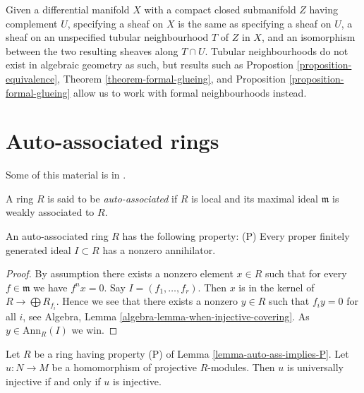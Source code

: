 \begin{remark}
\label{remark-topological-analogue}
Given a differential manifold $X$ with a compact closed submanifold $Z$
having complement $U$, specifying a sheaf on $X$ is the same as specifying 
a sheaf on $U$, a sheaf on an unspecified tubular neighbourhood $T$ of $Z$ in 
$X$, and an isomorphism between the two resulting sheaves along $T \cap U$.
Tubular neighbourhoods do not exist in algebraic geometry as such, but
results such as
Propostion \ref{proposition-equivalence},
Theorem \ref{theorem-formal-glueing}, and
Proposition \ref{proposition-formal-glueing}
allow us to work with formal neighbourhoods instead.
\end{remark}



\section{Auto-associated rings}
\label{section-auto-ass}

\noindent
Some of this material is in \cite{Autour}.

\begin{definition}
\label{definition-auto-ass}
A ring $R$ is said to be {\it auto-associated} if $R$ is local and its
maximal ideal $\mathfrak m$ is weakly associated to $R$.
\end{definition}

\begin{lemma}
\label{lemma-auto-ass-implies-P}
An auto-associated ring $R$ has the following property: (P)
Every proper finitely generated ideal $I \subset R$ has a nonzero
annihilator.
\end{lemma}

\begin{proof}
By assumption there exists a nonzero element $x \in R$ such that for every
$f \in \mathfrak m$ we have $f^n x = 0$. Say $I = (f_1, \ldots, f_r)$.
Then $x$ is in the kernel of $R \to \bigoplus R_{f_i}$. Hence we see
that there exists a nonzero $y \in R$ such that $f_i y = 0$ for all $i$, see
Algebra, Lemma \ref{algebra-lemma-when-injective-covering}.
As $y \in \text{Ann}_R(I)$ we win.
\end{proof}

\begin{lemma}
\label{lemma-P-universally-injective}
Let $R$ be a ring having property (P) of
Lemma \ref{lemma-auto-ass-implies-P}.
Let $u : N \to M$ be a homomorphism of projective $R$-modules.
Then $u$ is universally injective if and only if $u$ is injective.
\end{lemma}

